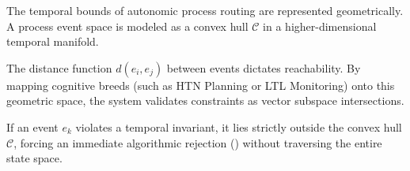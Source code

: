 The temporal bounds of autonomic process routing are represented geometrically. A process event space is modeled as a convex hull $\mathcal{C}$ in a higher-dimensional temporal manifold. 

The distance function $d(e_i, e_j)$ between events dictates reachability. By mapping cognitive breeds (such as HTN Planning or LTL Monitoring) onto this geometric space, the system validates constraints as vector subspace intersections.

\begin{lemma}
If an event $e_k$ violates a temporal invariant, it lies strictly outside the convex hull $\mathcal{C}$, forcing an immediate algorithmic rejection () without traversing the entire state space.
\end{lemma}
